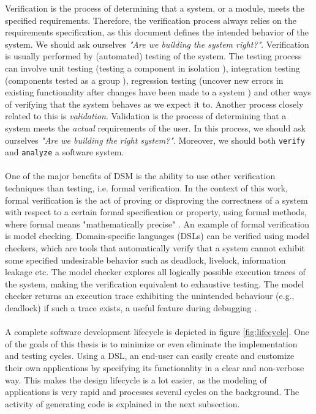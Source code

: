 Verification is the process of determining that a system, or a module, meets the specified requirements. Therefore, the verification process always relies on the requirements specification, as this document defines the intended behavior of the system. We should ask ourselves \textit{"Are we building the system right?"}. Verification is usually performed by (automated) testing of the system. The testing process can involve unit testing (testing a component in isolation \cite{UnitTesting}), integration testing (components tested as a group \cite{IntegrationTesting}), regression testing (uncover new errors in existing functionality after changes have been made to a system \cite{RegressionTesting}) and other ways of verifying that the system behaves as we expect it to. Another process closely related to this is \textit{validation}. Validation is the process of determining that a system meets the \textit{actual} requirements of the user. In this process, we should ask ourselves \textit{"Are we building the right system?"}. Moreover, we should both \texttt{verify} and \texttt{analyze} a software system. \\ \\
One of the major benefits of DSM is the ability to use other verification techniques than testing, i.e. formal verification. In the context of this work, formal verification is the act of proving or disproving the  correctness of a system with respect to a certain formal specification or property, using formal methods, where formal means "mathematically precise" \cite{FormalSpec}. An example of formal verification is model checking. Domain-specific languages (DSLs) can be verified using model checkers, which are tools that automatically verify that a system cannot exhibit some specified undesirable behavior such as deadlock, livelock, information leakage etc. The model checker explores all logically possible execution traces of the system, making the verification equivalent to exhaustive testing. The model checker returns an execution trace exhibiting the unintended behaviour  (e.g., deadlock) if such a 
trace exists, a useful feature during debugging \cite{ModelChecking}. \\ \\
A complete software development lifecycle is depicted in figure \ref{fig:lifecycle}. One of the goals of this thesis is to minimize or even eliminate the implementation and testing cycles. Using a DSL, an end-user can easily create and customize their own applications by specifying its functionality in a clear and non-verbose way. This makes the design lifecycle is a lot easier, as the modeling of applications is very rapid and processes several cycles on the background. The activity of generating code is explained in the next subsection.

